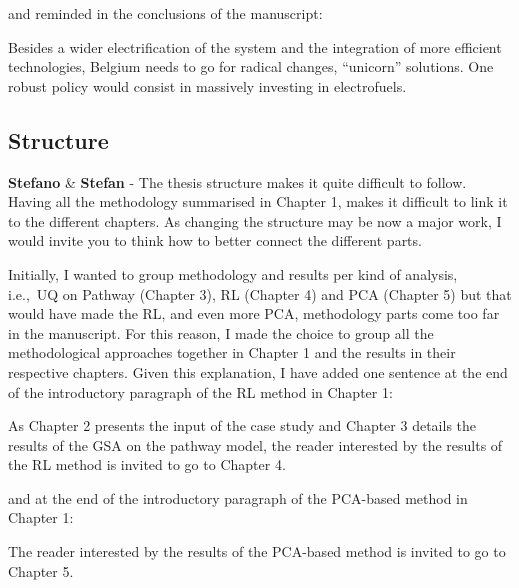 \documentclass[12pt,a4paper]{article}
\def\ie{i.e.,\ }
\begin{document}
and reminded {\color{blue}in the conclusions of the manuscript}:

\begin{mdframed}[style=manuscript] %
Besides a wider electrification of the system and the integration of more efficient technologies, Belgium needs to go for radical changes, ``unicorn'' solutions. One robust policy would consist in massively investing in electrofuels.
\end{mdframed}

\subsection{Structure}
\label{structure}

\begin{mdframed}[style=comment] %
{\color{orange} \textbf{Stefano}} \& {\color{teal} \textbf{Stefan}} - The thesis structure makes it quite difficult to follow. Having all the methodology summarised in Chapter 1, makes it difficult to link it to the different chapters. As changing the structure may be now a major work, I would invite you to think how to better connect the different parts. 
\end{mdframed}

\noindent Initially, I wanted to group methodology and results per kind of analysis, \ie UQ on Pathway (Chapter 3), RL (Chapter 4) and PCA (Chapter 5) but that would have made the RL, and even more PCA, methodology parts come too far in the manuscript. For this reason, I made the choice to group all the methodological approaches together in Chapter 1 and the results in their respective chapters.  Given this explanation, I have added one sentence {\color{blue}at the end of the introductory paragraph of the RL method in Chapter 1}:

\begin{mdframed}[style=manuscript] %
As Chapter 2 presents the input of the case study and Chapter 3 details the results of the GSA on the pathway model, the reader interested by the results of the RL method is invited to go to Chapter 4.
\end{mdframed}

\noindent and {\color{blue}at the end of the introductory paragraph of the PCA-based method in Chapter 1}:

\begin{mdframed}[style=manuscript] %
The reader interested by the results of the PCA-based method is invited to go to Chapter 5.
\end{mdframed}
\end{document}
